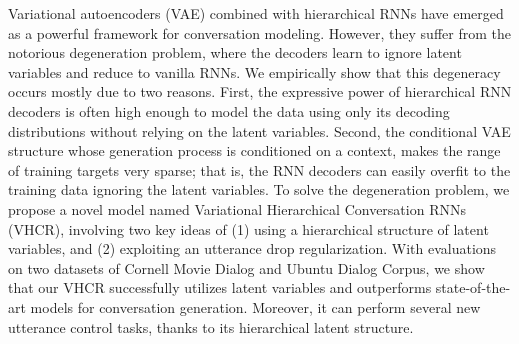 Variational autoencoders (VAE) combined with hierarchical RNNs have emerged as a powerful framework for conversation modeling. However, they suffer from the notorious degeneration problem, where the decoders learn to ignore latent variables and reduce to vanilla RNNs. We empirically show that this degeneracy occurs mostly due to two reasons. First, the expressive power of hierarchical RNN decoders is often high enough to model the data using only its decoding distributions without relying on the latent variables. Second, the conditional VAE structure whose generation process is conditioned on a context, makes the range of training targets very sparse; that is, the RNN decoders can easily overfit to the training data ignoring the latent variables. To solve the degeneration problem, we propose a novel model named Variational Hierarchical Conversation RNNs (VHCR), involving two key ideas of (1) using a hierarchical structure of latent variables, and (2) exploiting an utterance drop regularization. With evaluations on two datasets of Cornell Movie Dialog and Ubuntu Dialog Corpus, we show that our VHCR successfully utilizes latent variables and outperforms state-of-the-art models for conversation generation. Moreover, it can perform several new utterance control tasks, thanks to its hierarchical latent structure.
